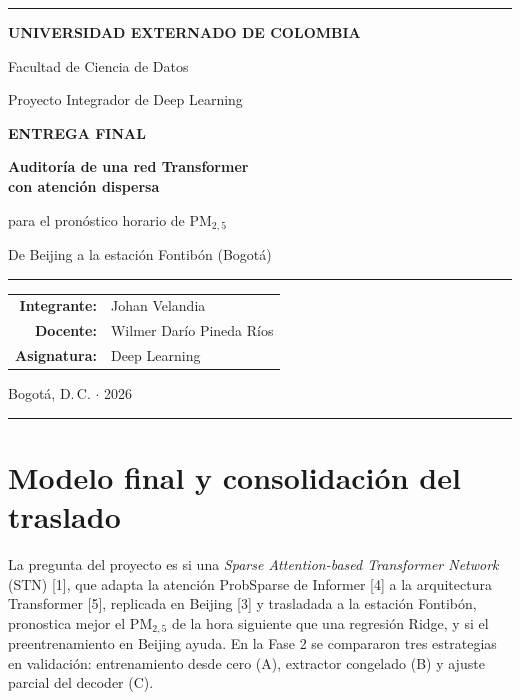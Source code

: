 \documentclass[11pt,letterpaper]{article}
\newcommand{\PM}{PM$_{2,5}$}
\begin{document}
\begin{titlepage}
\centering
{\color{verde}\rule{\textwidth}{2pt}}\par\vspace{2.2cm}
{\Large\bfseries\color{verde} UNIVERSIDAD EXTERNADO DE COLOMBIA}\par\vspace{0.3cm}
{\large Facultad de Ciencia de Datos}\par\vspace{2.2cm}
{\large Proyecto Integrador de Deep Learning}\par\vspace{0.3cm}
{\large\bfseries ENTREGA FINAL}\par\vspace{1.4cm}
{\huge\bfseries\color{verde} Auditoría de una red Transformer\\[0.2cm] con atención dispersa}\par\vspace{0.4cm}
{\Large para el pronóstico horario de \PM}\par\vspace{0.3cm}
{\large\color{gris} De Beijing a la estación Fontibón (Bogotá)}\par\vspace{1.0cm}
{\color{dorado}\rule{0.6\textwidth}{1pt}}\par\vspace{1.6cm}
\begin{tabular}{rl}
\textbf{Integrante:} & Johan Velandia\\
\textbf{Docente:} & Wilmer Darío Pineda Ríos\\
\textbf{Asignatura:} & Deep Learning
\end{tabular}\par
\vfill
{\large Bogotá, D.\,C. $\cdot$ 2026}\par\vspace{0.4cm}
{\color{verde}\rule{\textwidth}{2pt}}
\end{titlepage}

\section{Modelo final y consolidación del traslado}

La pregunta del proyecto es si una \emph{Sparse Attention-based Transformer Network} (STN) [1], que adapta la atención ProbSparse de
Informer [4] a la arquitectura Transformer [5], replicada en Beijing [3] y trasladada a la estación Fontibón, pronostica mejor el \PM{} de la hora siguiente que una
regresión Ridge, y si el preentrenamiento en Beijing ayuda. En la Fase 2 se compararon tres estrategias en
validación: entrenamiento desde cero (A), extractor congelado (B) y ajuste parcial del decoder (C).
\end{document}
